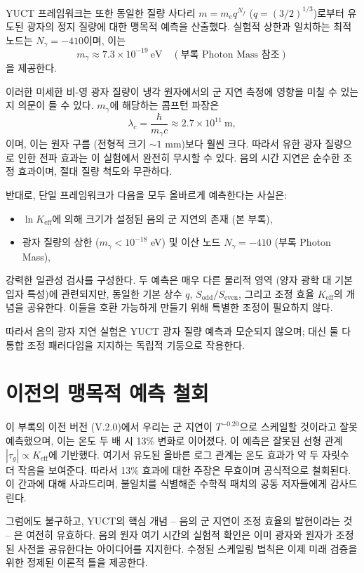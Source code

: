 \documentclass[12pt,a4paper]{article}
\newcommand{\Keff}{K_{\mathrm{eff}}}
\begin{document}
	YUCT 프레임워크는 또한 동일한 질량 사다리 \(m = m_e q^{N_f}\) (\(q=(3/2)^{1/3}\))로부터 유도된 광자의 정지 질량에 대한 맹목적 예측을 산출했다. 실험적 상한과 일치하는 최적 노드는 \(N_\gamma = -410\)이며, 이는
	\[
	m_\gamma \approx 7.3 \times 10^{-19}~\text{eV} \quad (\text{부록 Photon Mass 참조})
	\]
	을 제공한다.
	
	이러한 미세한 비-영 광자 질량이 냉각 원자에서의 군 지연 측정에 영향을 미칠 수 있는지 의문이 들 수 있다. \(m_\gamma\)에 해당하는 콤프턴 파장은
	\[
	\lambda_c = \frac{\hbar}{m_\gamma c} \approx 2.7\times10^{11}~\text{m},
	\]
	이며, 이는 원자 구름 (전형적 크기 \(\sim 1\) mm)보다 훨씬 크다. 따라서 유한 광자 질량으로 인한 전파 효과는 이 실험에서 완전히 무시할 수 있다. 음의 시간 지연은 순수한 조정 효과이며, 절대 질량 척도와 무관하다.
	
	반대로, 단일 프레임워크가 다음을 모두 올바르게 예측한다는 사실은:
	\begin{itemize}
		\item \(\ln\Keff\)에 의해 크기가 설정된 음의 군 지연의 존재 (본 부록),
		\item 광자 질량의 상한 (\(m_\gamma < 10^{-18}\) eV) 및 이산 노드 \(N_\gamma = -410\) (부록 Photon Mass),
	\end{itemize}
	강력한 일관성 검사를 구성한다. 두 예측은 매우 다른 물리적 영역 (양자 광학 대 기본 입자 특성)에 관련되지만, 동일한 기본 상수 \(q\), \(S_{\mathrm{odd}}/S_{\mathrm{even}}\), 그리고 조정 효율 \(\Keff\)의 개념을 공유한다. 이들을 호환 가능하게 만들기 위해 특별한 조정이 필요하지 않다.
	
	따라서 음의 광자 지연 실험은 YUCT 광자 질량 예측과 모순되지 않으며; 대신 둘 다 통합 조정 패러다임을 지지하는 독립적 기둥으로 작용한다.
	
	\section{이전의 맹목적 예측 철회}
	
	이 부록의 이전 버전 (V.2.0)에서 우리는 군 지연이 \(T^{-0.20}\)으로 스케일할 것이라고 잘못 예측했으며, 이는 온도 두 배 시 13\% 변화로 이어졌다. 이 예측은 잘못된 선형 관계 \(|\tau_g| \propto \Keff\)에 기반했다. 여기서 유도된 올바른 로그 관계는 온도 효과가 약 두 자릿수 더 작음을 보여준다. 따라서 13\% 효과에 대한 주장은 무효이며 공식적으로 철회된다. 이 간과에 대해 사과드리며, 불일치를 식별해준 수학적 패치의 공동 저자들에게 감사드린다.
	
	그럼에도 불구하고, YUCT의 핵심 개념 – 음의 군 지연이 조정 효율의 발현이라는 것 – 은 여전히 유효하다. 음의 원자 여기 시간의 실험적 확인은 이미 광자와 원자가 조정된 사전을 공유한다는 아이디어를 지지한다. 수정된 스케일링 법칙은 이제 미래 검증을 위한 정제된 이론적 틀을 제공한다.
	
\end{document}
